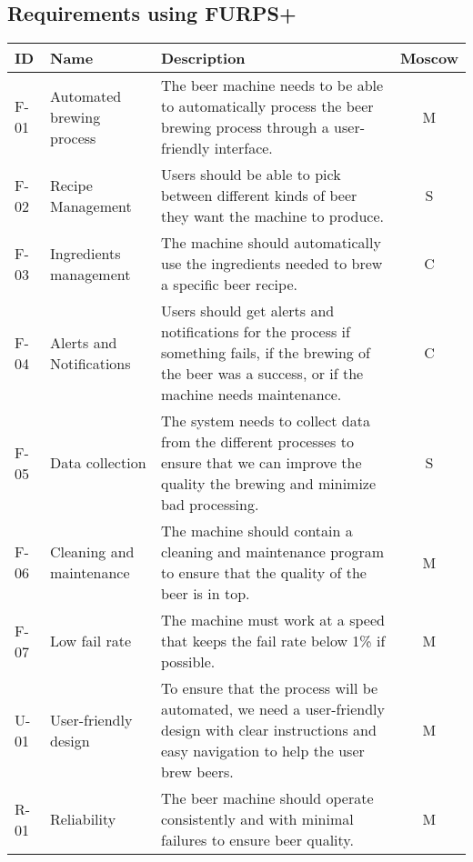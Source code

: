 \subsection{Requirements using FURPS+}
\begin{center}
    \sloppy
    \begin{longtable}{|p{1cm}|p{4cm}|p{8.5cm}|c|}
        \hline
        ID & Name & Description & Moscow \\ \hline
        F-01   & Automated brewing process  & The beer machine needs to be able to automatically process the beer brewing process through a user-friendly interface.                                        & M \\ \hline
        F-02   & Recipe Management          & Users should be able to pick between different kinds of beer they want the machine to produce.                                                                & S \\ \hline
        F-03   & Ingredients management     & The machine should automatically use the ingredients needed to brew a specific beer recipe.                                                                   & C \\ \hline
        F-04   & Alerts and Notifications   & Users should get alerts and notifications for the process if something fails, if the brewing of the beer was a success, or if the machine needs maintenance.   & C \\ \hline
        F-05   & Data collection            & The system needs to collect data from the different processes to ensure that we can improve the quality the brewing and minimize bad processing.                     & S \\ \hline
        F-06   & Cleaning and maintenance   & The machine should contain a cleaning and maintenance program to ensure that the quality of the beer is in top.                                               & M \\ \hline
        F-07   & Low fail rate              & The machine must work at a speed that keeps the fail rate below 1\% if possible.                                                                                & M \\ \hline
        U-01   & User-friendly design       & To ensure that the process will be automated, we need a user-friendly design with clear instructions and easy navigation to help the user brew beers.          & M \\ \hline
        R-01   & Reliability                & The beer machine should operate consistently and with minimal failures to ensure beer quality.                                                                & M \\ \hline

\end{longtable}
\end{center}
